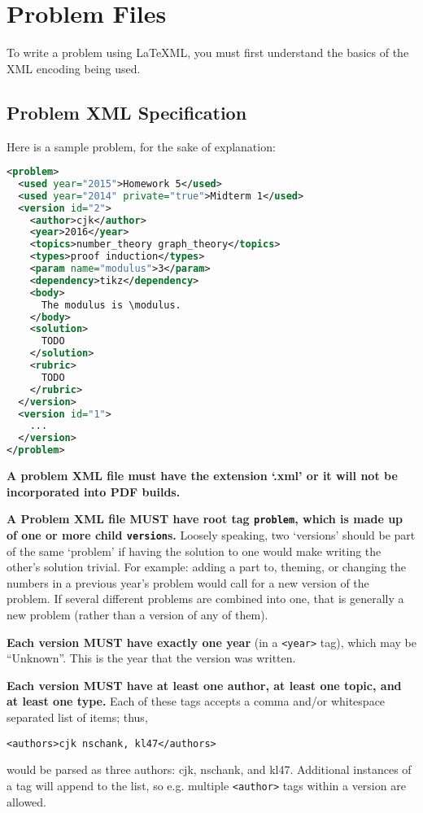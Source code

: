 \section{Problem Files}
  To write a problem using \LaTeX ML, you must first understand the basics of the XML encoding being used.
  
  \subsection{Problem XML Specification}
    Here is a sample problem, for the sake of explanation:
    \begin{mdframed}
      \begin{lstlisting}[language=XML,columns=fullflexible,breaklines=true]
<problem>
  <used year="2015">Homework 5</used>
  <used year="2014" private="true">Midterm 1</used>
  <version id="2">
    <author>cjk</author>
    <year>2016</year>
    <topics>number_theory graph_theory</topics>
    <types>proof induction</types>
    <param name="modulus">3</param>
    <dependency>tikz</dependency>
    <body>
      The modulus is \modulus.
    </body>
    <solution>
      TODO
    </solution>
    <rubric>
      TODO
    </rubric>
  </version>
  <version id="1">
    ...
  </version>
</problem>
      \end{lstlisting}
    \end{mdframed}
    
    \textbf{A problem XML file must have the extension `.xml' or it will not be incorporated into PDF builds.}
    
    \textbf{A Problem XML file MUST have root tag \texttt{problem}, which is made up of one or more child \texttt{version}s.} Loosely speaking, two `versions' should be part of the same `problem' if having the solution to one would make writing the other's solution trivial. For example: adding a part to, theming, or changing the numbers in a previous year's problem would call for a new version of the problem. If several different problems are combined into one, that is generally a new problem (rather than a version of any of them).
    
    \textbf{Each version MUST have exactly one year} (in a \texttt{<year>} tag), which may be ``Unknown''. This is the year that the version was written.
    
    \textbf{Each version MUST have at least one author, at least one topic, and at least one type.} Each of these tags accepts a comma and/or whitespace separated list of items; thus,
    \begin{center}
      \texttt{<authors>cjk nschank, kl47</authors>}
    \end{center}
    would be parsed as three authors: cjk, nschank, and kl47. Additional instances of a tag will append to the list, so e.g. multiple \texttt{<author>} tags within a version are allowed.
    
